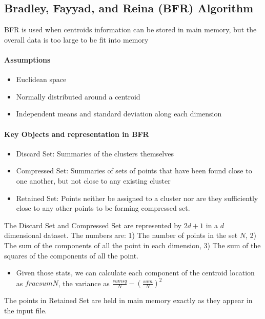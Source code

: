 \subsection{Bradley, Fayyad, and Reina (BFR) Algorithm} 
BFR is used when centroids information can be stored in main memory, but the overall data is too large to be fit into memory
\paragraph{Assumptions} 
    \begin{itemize}
        \item Euclidean space 
        \item Normally distributed around a centroid
        \item Independent means and standard deviation along each dimension 
    \end{itemize}

\paragraph{Key Objects and representation in BFR} 
    \begin{itemize}
        \item Discard Set: Summaries of the clusters themselves
        \item Compressed Set: Summaries of sets of points that have been found close to one another, but not close to any existing cluster
        \item Retained Set: Points neither be assigned to a cluster nor are they sufficiently close to any other points to be forming compressed set. 
    \end{itemize}
The Discard Set and Compressed Set are represented by $2d + 1$ in a $d$ dimensional dataset. The numbers are: 1) The number of points in the set $N$, 2) The sum of the components of all the point in each dimension, 3) The sum of the squares of the components of all the point. 
    \begin{itemize}
        \item Given those stats, we can calculate each component of the centroid location as $frac{sum}{N}$, the variance as $\frac{sumsq}{N} - (\frac{sum}{N})^2$
    \end{itemize}
The points in Retained Set are held in main memory exactly as they appear in the input file. 

